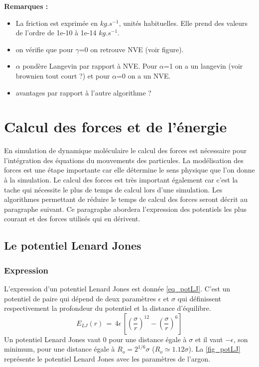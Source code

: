 \documentclass[11pt,a4paper,fleqn]{book}
\begin{document}
\textbf{Remarques :}
\begin{itemize}
	\item La friction est exprimée en $kg.s^{-1}$, unités habituelles. Elle
	prend des valeurs de l'ordre de 1e-10 à 1e-14 $kg.s^{-1}$. \\

	\item on vérifie que pour $\gamma$=0 on retrouve NVE (voir figure). \\

	\item $\alpha$ pondère Langevin par rapport à NVE. Pour $\alpha$=1
	on a un langevin (voir brownien tout court ?) et pour $\alpha$=0 on
	a un NVE. \\

	\item avantages par rapport à l'autre algorithme ?
\end{itemize}


\section{Calcul des forces et de l'énergie}

En simulation de dynamique moléculaire le calcul des forces est nécessaire
pour l'intégration des équations du mouvements des particules. La modélisation
des forces est une étape importante car elle détermine le sens physique que
l'on donne à la simulation. Le calcul des forces est très important également
car c'est la tache qui nécessite le plus de temps de calcul lors d'une simulation. 
Les algorithmes permettant de réduire le temps de calcul des forces seront
décrit au paragraphe suivant. Ce paragraphe abordera l'expression des
potentiels les plus courant et des forces utilisés qui en dérivent.

\subsection{Le potentiel Lenard Jones}

\subsubsection{Expression}

L'expression d'un potentiel Lenard Jones est donnée \ref{eq_potLJ}.
C'est un potentiel de paire qui dépend de deux paramètres $\epsilon$ et 
$\sigma$ qui définissent respectivement la profondeur du potentiel et
la distance d'équilibre. 
%
\begin{equation}\label{eq_potLJ}
	E_{LJ}(r) \, = \, 4 \epsilon \, \left[ \left(\frac{\sigma}{r}\right)^{12} 
			- \left(\frac{\sigma}{r}\right)^6 \right]
\end{equation}
%
Un potentiel Lenard Jones vaut 0 pour une distance égale à $\sigma$ et il 
vaut $-\epsilon$, son minimum, pour une distance égale à $R_o = 2^{1/6}\sigma$ 
($R_o\simeq1.12\sigma$). La \ref{fig_potLJ} représente le potentiel Lenard Jones 
avec les paramètres de l'argon.
\end{document}
